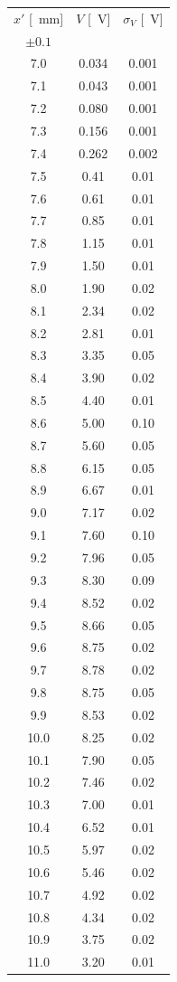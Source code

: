 \documentclass[10pt,oneside,a4paper]{article}
\begin{document}
\begin{minipage}[t]{0.33\linewidth}
\vspace{0cm}
\begin{center}
\begin{tabular}{c|c|c}
$x'$ [\SI{}{mm}] & $V$ [\SI{}{V}] & $\sigma_V$ [\SI{}{V}] \\
 $\pm 0.1$ & & \\
\hline
  7.0 & 0.034 & 0.001 \\
  7.1 & 0.043 & 0.001 \\
  7.2 & 0.080 & 0.001 \\
  7.3 & 0.156 & 0.001 \\
  7.4 & 0.262 & 0.002 \\
  7.5 & 0.41 & 0.01 \\
  7.6 & 0.61 & 0.01 \\
  7.7 & 0.85 & 0.01 \\
  7.8 & 1.15 & 0.01 \\
  7.9 & 1.50 & 0.01 \\
  8.0 & 1.90 & 0.02 \\
  8.1 & 2.34 & 0.02 \\
  8.2 & 2.81 & 0.01 \\
  8.3 & 3.35 & 0.05 \\
  8.4 & 3.90 & 0.02 \\
  8.5 & 4.40 & 0.01 \\
 8.6 & 5.00 & 0.10 \\
  8.7 & 5.60 & 0.05 \\
  8.8 & 6.15 & 0.05 \\
  8.9 & 6.67 & 0.01 \\
  9.0 & 7.17 & 0.02 \\
  9.1 & 7.60 & 0.10 \\
  9.2 & 7.96 & 0.05 \\
  9.3 & 8.30 & 0.09 \\
  9.4 & 8.52 & 0.02 \\
  9.5 & 8.66 & 0.05 \\
  9.6 & 8.75 & 0.02 \\
  9.7 & 8.78 & 0.02 \\
  9.8 & 8.75 & 0.05 \\
  9.9 & 8.53 & 0.02 \\
 10.0 & 8.25 & 0.02 \\
 10.1 & 7.90 & 0.05 \\
 10.2 & 7.46 & 0.02 \\
 10.3 & 7.00 & 0.01 \\
 10.4 & 6.52 & 0.01 \\
 10.5 & 5.97 & 0.02 \\
 10.6 & 5.46 & 0.02 \\
 10.7 & 4.92 & 0.02 \\
 10.8 & 4.34 & 0.02 \\
 10.9 & 3.75 & 0.02 \\
 11.0 & 3.20 & 0.01 \\
\hline
\end{tabular}
\end{center}
\end{minipage}
\end{document}
